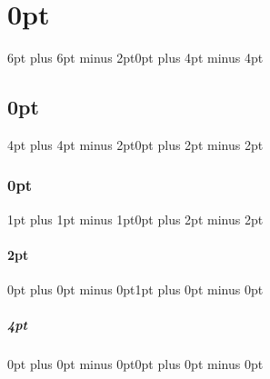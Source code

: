 \usepackage[nomain,nonumberlist,acronyms]{glossaries}

\usepackage{glossary-mcols}

\setcounter{secnumdepth}{5}

\setcounter{tocdepth}{5}

\titlespacing\chapter{0pt}{6pt plus 6pt minus 2pt}{0pt plus 4pt minus 4pt}
\titlespacing\section{0pt}{4pt plus 4pt minus 2pt}{0pt plus 2pt minus 2pt}
\titlespacing\subsection{0pt}{1pt plus 1pt minus 1pt}{0pt plus 2pt minus 2pt}
\titlespacing\subsubsection{2pt}{0pt plus 0pt minus 0pt}{1pt plus 0pt minus 0pt}
\titlespacing\paragraph{4pt}{0pt plus 0pt minus 0pt}{0pt plus 0pt minus 0pt}

\setlength{\parindent}{0pt}

\linespread{1.25}

\frenchspacing

\fancyhf{}
\fancyhead[OR]{\thepage}
\fancyhead[EL]{\thepage}

